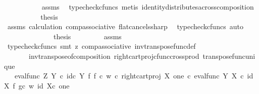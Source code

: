 \begin{isabellebody}
\ \ \ \ \ \ \ \ \ \isamarkupfalse%
\ assms\ \isamarkupfalse%
\ {\isacharparenleft}{\kern0pt}typecheck{\isacharunderscore}{\kern0pt}cfuncs{\isacharcomma}{\kern0pt}\ metis\ identity{\isacharunderscore}{\kern0pt}distributes{\isacharunderscore}{\kern0pt}across{\isacharunderscore}{\kern0pt}composition{\isacharparenright}{\kern0pt}\isanewline
\ \ \ \ \ \ \ \isamarkupfalse%
\ \isamarkupfalse%
\ {\isacharquery}{\kern0pt}thesis\isanewline
\ \ \ \ \ \ \ \ \ \isamarkupfalse%
\ assms\ calculation\ comp{\isacharunderscore}{\kern0pt}associative{}\ flat{\isacharunderscore}{\kern0pt}cancels{\isacharunderscore}{\kern0pt}sharp\ \isamarkupfalse%
\ {\isacharparenleft}{\kern0pt}typecheck{\isacharunderscore}{\kern0pt}cfuncs{\isacharcomma}{\kern0pt}\ auto{\isacharparenright}{\kern0pt}\isanewline
\ \ \ \ \ \isamarkupfalse%
\isanewline
\ \ \ \ \ \isamarkupfalse%
\ \isamarkupfalse%
\ {\isacharquery}{\kern0pt}thesis\isanewline
\ \ \ \ \ \ \ \isamarkupfalse%
\ assms\ \isamarkupfalse%
\ {\isacharparenleft}{\kern0pt}typecheck{\isacharunderscore}{\kern0pt}cfuncs{\isacharcomma}{\kern0pt}\ smt\ {\isacharparenleft}{\kern0pt}z{}{\isacharparenright}{\kern0pt}\ comp{\isacharunderscore}{\kern0pt}associative{}\ inv{\isacharunderscore}{\kern0pt}transpose{\isacharunderscore}{\kern0pt}func{\isacharunderscore}{\kern0pt}def{}\ \isanewline
\ \ \ \ \ \ \ inv{\isacharunderscore}{\kern0pt}transpose{\isacharunderscore}{\kern0pt}of{\isacharunderscore}{\kern0pt}composition\ right{\isacharunderscore}{\kern0pt}cart{\isacharunderscore}{\kern0pt}proj{\isacharunderscore}{\kern0pt}cfunc{\isacharunderscore}{\kern0pt}cross{\isacharunderscore}{\kern0pt}prod\ transpose{\isacharunderscore}{\kern0pt}func{\isacharunderscore}{\kern0pt}unique{\isacharparenright}{\kern0pt}\isanewline
\ \ \isamarkupfalse%
\isanewline
\ \ \isamarkupfalse%
\ \isamarkupfalse%
\ {\isachardoublequoteopen}{\isachardot}{\kern0pt}{\isachardot}{\kern0pt}{\isachardot}{\kern0pt}\ {\isacharequal}{\kern0pt}\ {\isacharparenleft}{\kern0pt}eval{\isacharunderscore}{\kern0pt}func\ Z\ Y\ {\isasymcirc}\isactrlsub c\ {\isacharparenleft}{\kern0pt}id\isactrlsub c\ Y\ {\isasymtimes}\isactrlsub f\ {\isacharparenleft}{\kern0pt}{\isacharparenleft}{\kern0pt}f\ {\isasymcirc}\isactrlsub c\ w{\isacharparenright}{\kern0pt}\ {\isasymcirc}\isactrlsub c\ right{\isacharunderscore}{\kern0pt}cart{\isacharunderscore}{\kern0pt}proj\ X\ one{\isacharparenright}{\kern0pt}{\isacharparenright}{\kern0pt}\ {\isasymcirc}\isactrlsub c\ {\isasymlangle}eval{\isacharunderscore}{\kern0pt}func\ Y\ X\ {\isasymcirc}\isactrlsub c\ {\isacharparenleft}{\kern0pt}id\ X\ {\isasymtimes}\isactrlsub f\ {\isacharparenleft}{\kern0pt}g{\isasymcirc}\isactrlsub c\ w{\isacharparenright}{\kern0pt}{\isacharparenright}{\kern0pt}{\isacharcomma}{\kern0pt}\ id\ {\isacharparenleft}{\kern0pt}X{\isasymtimes}\isactrlsub c\ one{\isacharparenright}{\kern0pt}{\isasymrangle}{\isacharparenright}{\kern0pt}\isactrlsup {\isasymsharp}{\isachardoublequoteclose}\isanewline

\end{isabellebody}
